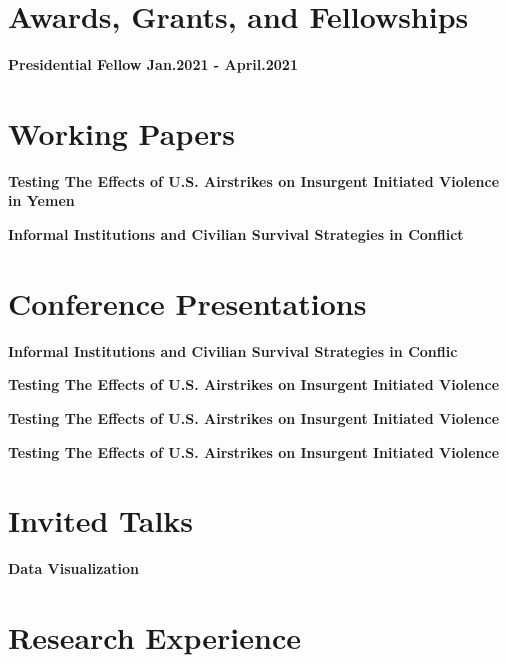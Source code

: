 \documentclass[margin]{res}
\newcommand{\fullhrulefill}{%
  \hspace*{-\sectionwidth}\hrulefill%
  }
\begin{document}
\begin{resume}
\section{Awards, Grants, and Fellowships}
\textbf {Presidential Fellow \hfill {Jan.2021 - April.2021 } \\ }

\fullhrulefill
\section{Working Papers}
\textbf {Testing The Effects of U.S. Airstrikes on Insurgent Initiated Violence in Yemen}

\textbf {Informal Institutions and Civilian Survival Strategies in Conflict}

\fullhrulefill
\section {Conference Presentations}


\textbf {Informal Institutions and Civilian Survival Strategies in Conflic \hfill  \\ }

\textbf {Testing The Effects of U.S. Airstrikes on Insurgent Initiated Violence \hfill  \\ }

\textbf {Testing The Effects of U.S. Airstrikes on Insurgent Initiated Violence \hfill  \\ }

\textbf {Testing The Effects of U.S. Airstrikes on Insurgent Initiated Violence \hfill \\ }

\fullhrulefill
\section{Invited Talks}

\textbf{Data Visualization \hfill \\}

\fullhrulefill
\section{ Research Experience}


\end{resume}
\end{document}
